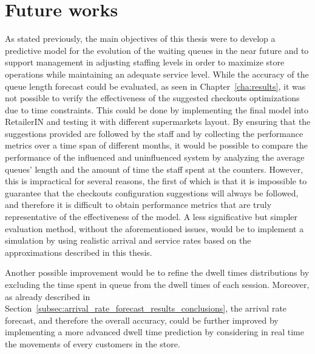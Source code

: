 \section{Future works}
\label{sec:future_works}

As stated previously, the main objectives of this thesis were to develop a predictive model for the evolution of the waiting queues in the near future and to support management in adjusting staffing levels in order to maximize store operations while maintaining an adequate service level. While the accuracy of the queue length forecast could be evaluated, as seen in Chapter~\ref{cha:results}, it was not possible to verify the effectiveness of the suggested checkouts optimizations due to time constraints. This could be done by implementing the final model into RetailerIN and testing it with different supermarkets layout. By ensuring that the suggestions provided are followed by the staff and by collecting the performance metrics over a time span of different months, it would be possible to compare the performance of the influenced and uninfluenced system by analyzing the average queues' length and the amount of time the staff spent at the counters. However, this is impractical for several reasons, the first of which is that it is impossible to guarantee that the checkouts configuration suggestions will always be followed, and therefore it is difficult to obtain performance metrics that are  truly representative of the effectiveness of the model. A less significative but simpler evaluation method, without the aforementioned issues, would be to implement a simulation by using realistic arrival and service rates based on the approximations described in this thesis.

Another possible improvement would be to refine the dwell times distributions by excluding the time spent in queue from the dwell times of each session. Moreover, as already described in Section~\ref{subsec:arrival_rate_forecast_results_conclusions}, the arrival rate forecast, and therefore the overall accuracy, could be further improved by implementing a more advanced dwell time prediction by considering in real time the movements of every customers in the store.

\clearpage


